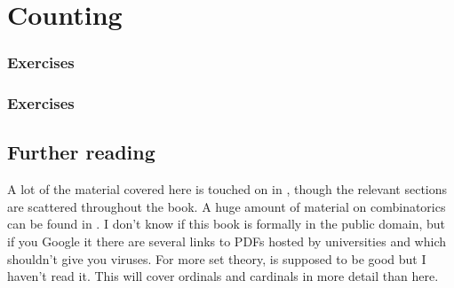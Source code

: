 \documentclass{article}
\theoremstyle{plain}
\numberwithin{theorem}{subsection}
\newcommand*{\prefix}{}
\begin{document}
\section{Counting}{
\let\section\subsection
\let\subsection\subsubsection

\subsubsection*{Exercises}



\subsubsection*{Exercises}


%
\section{Further reading}
A lot of the material covered here is touched on in \cite{LTLM17}, though the relevant sections are scattered throughout the book. A huge amount of material on combinatorics can be found in \cite{GKP94}. I don't know if this book is formally in the public domain, but if you Google it there are several links to PDFs hosted by universities and which shouldn't give you viruses. For more set theory, \cite{Halm60} is supposed to be good but I haven't read it. This will cover ordinals and cardinals in more detail than here. }

\newpage
{}
\renewcommand*{\prefix}{PAD}

\end{document}

